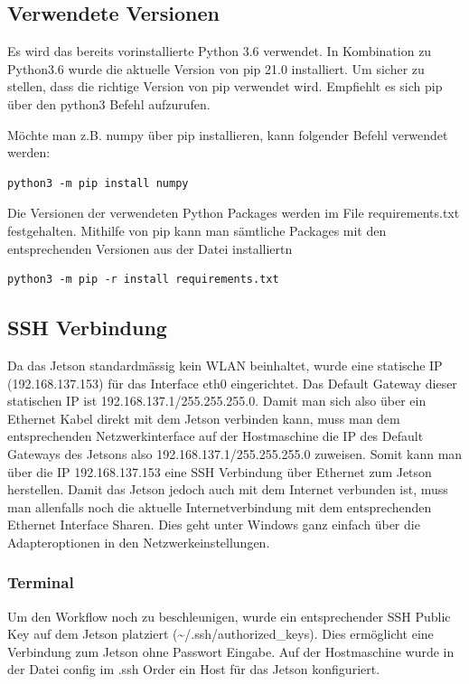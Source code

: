 \subsection{Verwendete Versionen}
Es wird das bereits vorinstallierte Python 3.6 verwendet. In Kombination zu Python3.6 wurde die aktuelle Version von pip 21.0 installiert. Um sicher zu stellen, dass die richtige Version von pip verwendet wird. Empfiehlt es sich pip über den python3 Befehl aufzurufen.

Möchte man z.B. numpy über pip installieren, kann folgender Befehl verwendet werden:
\begin{verbatim}
python3 -m pip install numpy
\end{verbatim}

Die Versionen der verwendeten Python Packages werden im File requirements.txt festgehalten. Mithilfe von pip kann man sämtliche Packages mit den entsprechenden Versionen aus der Datei installiertn

\begin{verbatim}
python3 -m pip -r install requirements.txt
\end{verbatim}

\subsection{SSH Verbindung}
Da das Jetson standardmässig kein WLAN beinhaltet, wurde eine statische IP (192.168.137.153) für das Interface eth0 eingerichtet. Das Default Gateway dieser statischen IP ist 192.168.137.1/255.255.255.0. Damit man sich also über ein Ethernet Kabel direkt mit dem Jetson verbinden kann, muss man dem entsprechenden Netzwerkinterface auf der Hostmaschine die IP des Default Gateways des Jetsons also 192.168.137.1/255.255.255.0 zuweisen. Somit kann man über die IP 192.168.137.153 eine SSH Verbindung über Ethernet zum Jetson herstellen. Damit das Jetson jedoch auch mit dem Internet verbunden ist, muss man allenfalls noch die aktuelle Internetverbindung mit dem entsprechenden Ethernet Interface Sharen. Dies geht unter Windows ganz einfach über die Adapteroptionen in den Netzwerkeinstellungen.

\subsubsection{Terminal}
Um den Workflow noch zu beschleunigen, wurde ein entsprechender SSH Public Key auf dem Jetson platziert (\textasciitilde/.ssh/authorized\_keys). Dies ermöglicht eine Verbindung zum Jetson ohne Passwort Eingabe. Auf der Hostmaschine wurde in der Datei config im .ssh Order ein Host für das Jetson konfiguriert.

